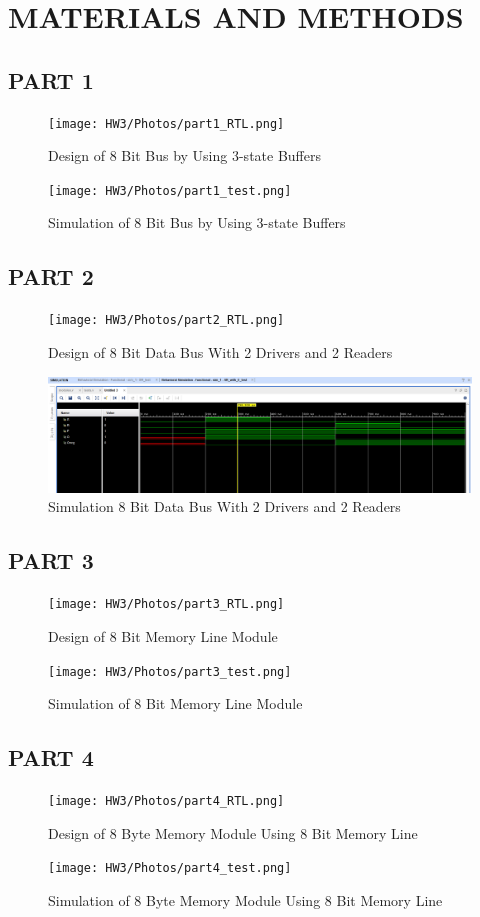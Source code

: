 \documentclass[pdftex,12pt,a4paper]{article}
\begin{document}
\section{MATERIALS AND METHODS}
\subsection{PART 1}
\begin{figure}[ht]
	\centering
	\texttt{[image: HW3/Photos/part1\_RTL.png]}	
	\caption{Design of 8 Bit Bus by Using 3-state Buffers}
	\label{Part 1}
 	\texttt{[image: HW3/Photos/part1\_test.png]}	
	\caption{Simulation of 8 Bit Bus by Using 3-state Buffers}
	\label{Part 1}
\end{figure}

\subsection{PART 2}
\begin{figure}[ht]
	\centering
	\texttt{[image: HW3/Photos/part2\_RTL.png]}	
	\caption{Design of 8 Bit Data Bus With 2 Drivers and 2 Readers}
	\label{Part 2}
	\includegraphics[width=1.0\textwidth]{HW2/Photos/part2_test.png}	
	\caption{Simulation 8 Bit Data Bus With 2 Drivers and 2 Readers}
	\label{Part 2}
\end{figure}

\subsection{PART 3}
\begin{figure}[ht]
	\centering
	\texttt{[image: HW3/Photos/part3\_RTL.png]}	
	\caption{Design of 8 Bit Memory Line Module}
	\label{Part 3}
        \texttt{[image: HW3/Photos/part3\_test.png]}	
	\caption{Simulation of 8 Bit Memory Line Module}
	\label{Part 3}
\end{figure}

\subsection{PART 4}
\begin{figure}[ht]
	\centering
	\texttt{[image: HW3/Photos/part4\_RTL.png]}	
	\caption{Design of 8 Byte Memory Module Using 8 Bit Memory Line}
	\label{Part 4}
        \texttt{[image: HW3/Photos/part4\_test.png]}	
	\caption{Simulation of 8 Byte Memory Module Using 8 Bit Memory Line}
	\label{Part 4}
\end{figure}
\end{document}
